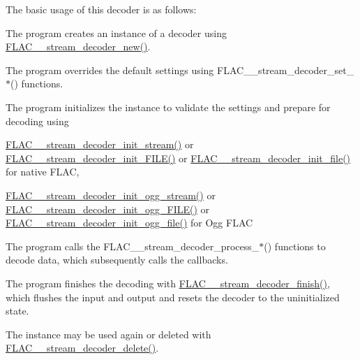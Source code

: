 The basic usage of this decoder is as follows\+:
\begin{DoxyItemize}
\item The program creates an instance of a decoder using \hyperlink{group__flac__stream__decoder_ga7159eefc074dfbab4a37462f69326091}{F\+L\+A\+C\+\_\+\+\_\+stream\+\_\+decoder\+\_\+new()}.
\item The program overrides the default settings using F\+L\+A\+C\+\_\+\+\_\+stream\+\_\+decoder\+\_\+set\+\_\+$\ast$() functions.
\item The program initializes the instance to validate the settings and prepare for decoding using
\begin{DoxyItemize}
\item \hyperlink{group__flac__stream__decoder_ga32c28a56a2bdfa2333edbd3d991894d7}{F\+L\+A\+C\+\_\+\+\_\+stream\+\_\+decoder\+\_\+init\+\_\+stream()} or \hyperlink{group__flac__stream__decoder_ga38f9eb46bf112af205f86b4cbac9980c}{F\+L\+A\+C\+\_\+\+\_\+stream\+\_\+decoder\+\_\+init\+\_\+\+F\+I\+L\+E()} or \hyperlink{group__flac__stream__decoder_ga1692108a97012d1c5f79baf7df012c33}{F\+L\+A\+C\+\_\+\+\_\+stream\+\_\+decoder\+\_\+init\+\_\+file()} for native F\+L\+AC,
\item \hyperlink{group__flac__stream__decoder_ga78bf285b54e5aaee73a214c108683a72}{F\+L\+A\+C\+\_\+\+\_\+stream\+\_\+decoder\+\_\+init\+\_\+ogg\+\_\+stream()} or \hyperlink{group__flac__stream__decoder_gac6a35b1db07e057ec9912f637b37dd74}{F\+L\+A\+C\+\_\+\+\_\+stream\+\_\+decoder\+\_\+init\+\_\+ogg\+\_\+\+F\+I\+L\+E()} or \hyperlink{group__flac__stream__decoder_ga609f2a43987d6abeaef654575462030c}{F\+L\+A\+C\+\_\+\+\_\+stream\+\_\+decoder\+\_\+init\+\_\+ogg\+\_\+file()} for Ogg F\+L\+AC
\end{DoxyItemize}
\item The program calls the F\+L\+A\+C\+\_\+\+\_\+stream\+\_\+decoder\+\_\+process\+\_\+$\ast$() functions to decode data, which subsequently calls the callbacks.
\item The program finishes the decoding with \hyperlink{group__flac__stream__decoder_gaa51bb38f762ee11b320a0839f165c5ce}{F\+L\+A\+C\+\_\+\+\_\+stream\+\_\+decoder\+\_\+finish()}, which flushes the input and output and resets the decoder to the uninitialized state.
\item The instance may be used again or deleted with \hyperlink{group__flac__stream__decoder_gab958ee28b829be37e541946676ad9677}{F\+L\+A\+C\+\_\+\+\_\+stream\+\_\+decoder\+\_\+delete()}.
\end{DoxyItemize}

